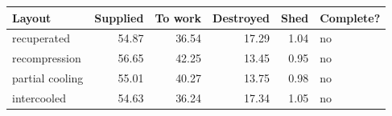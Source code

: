 \begin{tabular}{@{}lrrrrl@{}}
\toprule
Layout & Supplied & To work & Destroyed & Shed & Complete? \\
\midrule
recuperated & 54.87 & 36.54 & 17.29 & 1.04 & no \\
recompression & 56.65 & 42.25 & 13.45 & 0.95 & no \\
partial cooling & 55.01 & 40.27 & 13.75 & 0.98 & no \\
intercooled & 54.63 & 36.24 & 17.34 & 1.05 & no \\
\bottomrule
\end{tabular}
